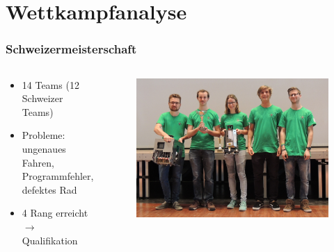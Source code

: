 \section{Wettkampfanalyse}

%	

\begin{frame}
	\frametitle{Schweizermeisterschaft}
	
	\vspace{-3em}
	
	\begin{columns}[t]
		\begin{column}{0.45\textwidth}
			\begin{center}
				\begin{itemize}
					\item 14 Teams (12 Schweizer Teams)
					\item Probleme: ungenaues Fahren, Programmfehler, defektes Rad
					\item 4 Rang erreicht $\rightarrow$ Qualifikation
				\end{itemize}
			\end{center}
		\end{column}
		\begin{column}{0.55\textwidth}
			\begin{figure}
				\includegraphics[width=0.9\columnwidth]{../images/presentation/swisseurobot.jpg}
			\end{figure}
		\end{column}
	\end{columns}
	
\end{frame}

